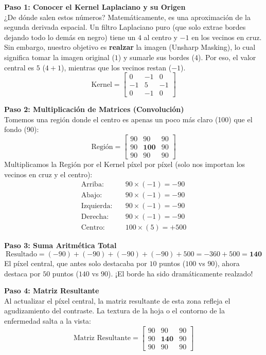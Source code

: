 \documentclass[11pt,a4paper]{article}
\begin{document}
\textbf{Paso 1: Conocer el Kernel Laplaciano y su Origen} \\
¿De dónde salen estos números? Matemáticamente, es una aproximación de la segunda derivada espacial. Un filtro Laplaciano puro (que solo extrae bordes dejando todo lo demás en negro) tiene un $4$ al centro y $-1$ en los vecinos en cruz. Sin embargo, nuestro objetivo es \textbf{realzar} la imagen (Unsharp Masking), lo cual significa tomar la imagen original ($1$) y sumarle sus bordes ($4$). Por eso, el valor central es $5$ ($4+1$), mientras que los vecinos restan ($-1$).
$$
\text{Kernel} = \begin{bmatrix}
 0 & -1 &  0 \\
-1 &  5 & -1 \\
 0 & -1 &  0
\end{bmatrix}
$$

\textbf{Paso 2: Multiplicación de Matrices (Convolución)} \\
Tomemos una región donde el centro es apenas un poco más claro (100) que el fondo (90):
$$
\text{Región} = \begin{bmatrix}
90 & 90 & 90 \\
90 & \mathbf{100} & 90 \\
90 & 90 & 90
\end{bmatrix}
$$
Multiplicamos la Región por el Kernel píxel por píxel (solo nos importan los vecinos en cruz y el centro):
\begin{align*}
\text{Arriba:} \quad & 90 \times (-1) = -90 \\
\text{Abajo:} \quad & 90 \times (-1) = -90 \\
\text{Izquierda:} \quad & 90 \times (-1) = -90 \\
\text{Derecha:} \quad & 90 \times (-1) = -90 \\
\text{Centro:} \quad & 100 \times (5) = +500
\end{align*}

\textbf{Paso 3: Suma Aritmética Total} \\
$$
\text{Resultado} = (-90) + (-90) + (-90) + (-90) + 500 = -360 + 500 = \mathbf{140}
$$
El píxel central, que antes solo destacaba por $10$ puntos ($100$ vs $90$), ahora destaca por $50$ puntos ($140$ vs $90$). ¡El borde ha sido dramáticamente realzado!

\textbf{Paso 4: Matriz Resultante} \\
Al actualizar el píxel central, la matriz resultante de esta zona refleja el agudizamiento del contraste. La textura de la hoja o el contorno de la enfermedad salta a la vista:
$$
\text{Matriz Resultante} = \begin{bmatrix}
90 & 90 & 90 \\
90 & \mathbf{140} & 90 \\
90 & 90 & 90
\end{bmatrix}
$$
\end{document}
